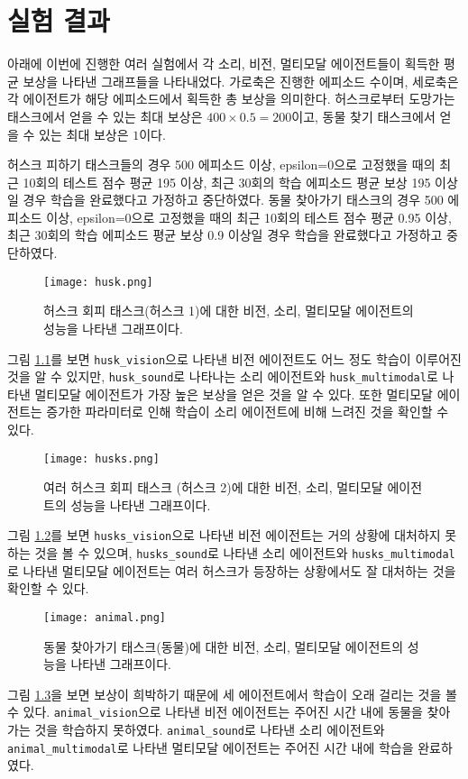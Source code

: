 \documentclass[oneside, under, ko]{snuthesis}
\begin{document}
\chapter{실험 결과}
아래에 이번에 진행한 여러 실험에서 각 소리, 비전, 멀티모달 에이전트들이 획득한 평균 보상을 나타낸 그래프들을 나타내었다. 가로축은 진행한 에피소드 수이며, 세로축은 각 에이전트가 해당 에피소드에서 획득한 총 보상을 의미한다. 허스크로부터 도망가는 태스크에서 얻을 수 있는 최대 보상은 $400 \times 0.5 = 200 $이고, 동물 찾기 태스크에서 얻을 수 있는 최대 보상은 $1$이다.

허스크 피하기 태스크들의 경우 500 에피소드 이상, epsilon=0으로 고정했을 때의 최근 10회의 테스트 점수 평균 195 이상, 최근 30회의 학습 에피소드 평균 보상 195 이상일 경우 학습을 완료했다고 가정하고 중단하였다. 동물 찾아가기 태스크의 경우 500 에피소드 이상, epsilon=0으로 고정했을 때의 최근 10회의 테스트 점수 평균 0.95 이상, 최근 30회의 학습 에피소드 평균 보상 0.9 이상일 경우 학습을 완료했다고 가정하고 중단하였다.
\begin{figure}[H]
    \centering
    \texttt{[image: husk.png]}
    \caption{허스크 회피 태스크(허스크 1)에 대한 비전, 소리, 멀티모달 에이전트의 성능을 나타낸 그래프이다.}
    \label{fig:husk}
\end{figure}
그림 \ref{fig:husk}를 보면 \lstinline{husk_vision}으로 나타낸 비전 에이전트도 어느 정도 학습이 이루어진 것을 알 수 있지만, \lstinline{husk_sound}로 나타나는 소리 에이전트와 \lstinline{husk_multimodal}로 나타낸 멀티모달 에이전트가 가장 높은 보상을 얻은 것을 알 수 있다. 또한 멀티모달 에이전트는 증가한 파라미터로 인해 학습이 소리 에이전트에 비해 느려진 것을 확인할 수 있다.

\begin{figure}[H]
    \centering
    \texttt{[image: husks.png]}
    \caption{여러 허스크 회피 태스크 (허스크 2)에 대한 비전, 소리, 멀티모달 에이전트의 성능을 나타낸 그래프이다. }
    \label{fig:husks}
\end{figure}
그림 \ref{fig:husks}를 보면 \lstinline{husks_vision}으로 나타낸 비전 에이전트는 거의 상황에 대처하지 못하는 것을 볼 수 있으며, \lstinline{husks_sound}로 나타낸 소리 에이전트와 \lstinline{husks_multimodal}로 나타낸 멀티모달 에이전트는 여러 허스크가 등장하는 상황에서도 잘 대처하는 것을 확인할 수 있다.

\begin{figure}[H]
    \centering
    \texttt{[image: animal.png]}
    \caption{동물 찾아가기 태스크(동물)에 대한 비전, 소리, 멀티모달 에이전트의 성능을 나타낸 그래프이다.}
    \label{fig:animal}
\end{figure}
그림 \ref{fig:animal}을 보면 보상이 희박하기 때문에 세 에이전트에서 학습이 오래 걸리는 것을 볼 수 있다. \lstinline{animal_vision}으로 나타낸 비전 에이전트는 주어진 시간 내에 동물을 찾아가는 것을 학습하지 못하였다. \lstinline{animal_sound}로 나타낸 소리 에이전트와 \lstinline{animal_multimodal}로 나타낸 멀티모달 에이전트는 주어진 시간 내에 학습을 완료하였다.
\end{document}
